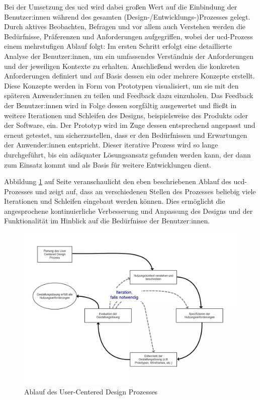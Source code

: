 \documentclass[a4paper,12pt,twoside]{scrreprt}
\begin{document}
\medskip

Bei der Umsetzung des \ac{ucd} wird dabei großen Wert auf die Einbindung der Benutzer:innen während des gesamten (Design-/Entwicklungs-)Prozesses gelegt. Durch aktives Beobachten, Befragen und vor allem auch Verstehen werden die Bedürfnisse, Präferenzen und Anforderungen aufgegriffen, wobei der \ac{ucd}-Prozess einem  mehrstufigen Ablauf folgt: Im ersten Schritt erfolgt eine detaillierte Analyse der Benutzer:innen, um ein umfassendes Verständnis der Anforderungen und der jeweiligen Kontexte zu erhalten. Anschließend werden die konkreten Anforderungen definiert und auf Basis dessen ein oder mehrere Konzepte erstellt. Diese Konzepte werden in Form von Prototypen visualisiert, um sie mit den späteren Anwender:innen zu teilen und Feedback dazu einzuholen. Das Feedback der Benutzer:innen wird in Folge dessen sorgfältig ausgewertet und fließt in weitere Iterationen und Schleifen des Designs, beispielsweise des Produkts oder der Software, ein. Der Prototyp wird im Zuge dessen entsprechend angepasst und erneut getestet, um sicherzustellen, dass er den Bedürfnissen und Erwartungen der Anwender:innen entspricht. Dieser iterative Prozess wird so lange durchgeführt, bis ein adäquater Lösungsansatz gefunden werden kann, der dann zum Einsatz kommt und als Basis für weitere Entwicklungen dient. \cite{frieling_user_2019, ionos_se_user-centered_2022}

\medskip

Abbildung \ref{fig:ucd-prozess-ablauf} auf Seite \pageref{fig:ucd-prozess-ablauf} veranschaulicht den eben beschriebenen Ablauf des \ac{ucd}-Prozesses und zeigt auf, dass an verschiedenen Stellen des Prozesses beliebig viele Iterationen und Schleifen eingebaut werden können. Dies ermöglicht die angesprochene kontinuierliche Verbesserung und Anpassung des Designs und der Funktionalität im Hinblick auf die Bedürfnisse der Benutzer:innen.

\begin{figure}[ht!]
    \centering
    \includegraphics[width=.75\linewidth]{thesis/images/Frieling_UCD-Prozess.png}
    \caption[Ablauf des User-Centered Design Prozesses]{Ablauf des User-Centered Design Prozesses \cite{frieling_user_2019}}
    \label{fig:ucd-prozess-ablauf}
\end{figure}
\end{document}
